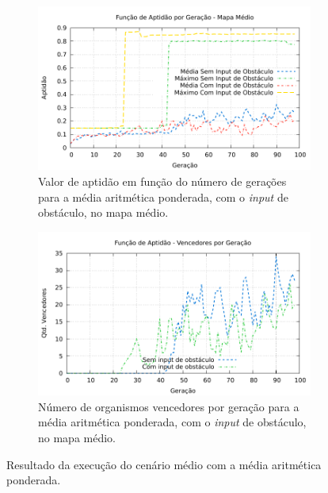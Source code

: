 \begin{figure}[H]
\centering
	\begin{subfigure}[b]{0.4\textwidth}
        \includegraphics[width=\textwidth]{fig/medium-wam-obs-fitness-experiment.pdf}
        \caption{Valor de aptidão em função do número de gerações para a média
        aritmética ponderada, com o \textit{input} de obstáculo, no mapa
        médio.}
	\end{subfigure}
	\begin{subfigure}[b]{0.4\textwidth}
        \includegraphics[width=\textwidth]{fig/medium-wam-obs-winners-experiment.pdf}
        \caption{Número de organismos vencedores por geração para a média
        aritmética ponderada, com o \textit{input} de obstáculo, no mapa
        médio.}
	\end{subfigure}

    \caption{Resultado da execução do cenário médio com a média aritmética
    ponderada.}
	\label{fig:medium-wam-obs-fitness-experiment}
\end{figure}

